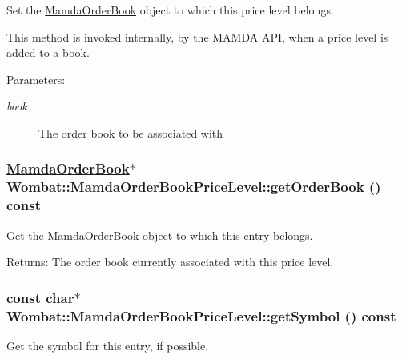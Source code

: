 Set the \hyperlink{classWombat_1_1MamdaOrderBook}{Mamda\-Order\-Book} object to which this price level belongs. 

This method is invoked internally, by the MAMDA API, when a price level is added to a book.

\begin{Desc}
\item[Parameters:]
\begin{description}
\item[{\em book}]The order book to be associated with \end{description}
\end{Desc}
\hypertarget{classWombat_1_1MamdaOrderBookPriceLevel_db787cef3be753da0c212480f1b6b643}{
\subsubsection[getOrderBook]{\setlength{\rightskip}{0pt plus 5cm}\hyperlink{classWombat_1_1MamdaOrderBook}{Mamda\-Order\-Book}$\ast$ Wombat::Mamda\-Order\-Book\-Price\-Level::get\-Order\-Book () const}}
\label{classWombat_1_1MamdaOrderBookPriceLevel_db787cef3be753da0c212480f1b6b643}


Get the \hyperlink{classWombat_1_1MamdaOrderBook}{Mamda\-Order\-Book} object to which this entry belongs. 

\begin{Desc}
\item[Returns:]The order book currently associated with this price level. \end{Desc}
\hypertarget{classWombat_1_1MamdaOrderBookPriceLevel_922b3305222ba444308952f8c56bba58}{
\subsubsection[getSymbol]{\setlength{\rightskip}{0pt plus 5cm}const char$\ast$ Wombat::Mamda\-Order\-Book\-Price\-Level::get\-Symbol () const}}
\label{classWombat_1_1MamdaOrderBookPriceLevel_922b3305222ba444308952f8c56bba58}


Get the symbol for this entry, if possible. 

